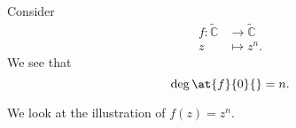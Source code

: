 \begin{eg}[Degree of \(z^n\)]
	Consider
	\[
		\begin{split}
			f\colon \widetilde{\mathbb{C}} & \to \widetilde{\mathbb{C}}\\
			z&\mapsto z^n.
		\end{split}
	\]
	We see that
	\[
		\deg \at{f}{0}{} = n.
	\]
\end{eg}
\begin{explanation}
	We look at the illustration of \(f(z) = z^n\).
	\begin{figure}[H]
		\centering
		\label{fig:eg:lec31-degree-n}
	\end{figure}
\end{explanation}